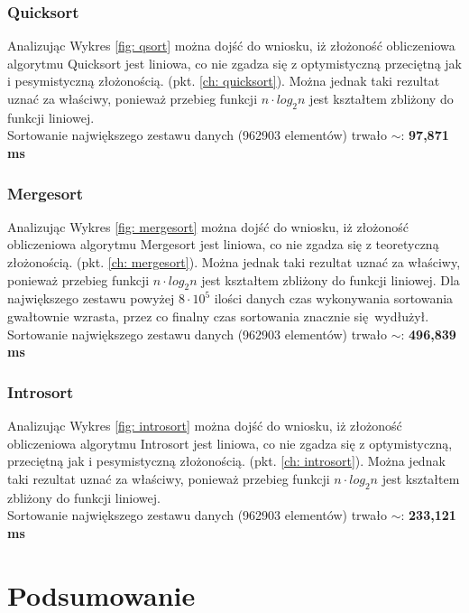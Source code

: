 \documentclass[12pt]{article}
\begin{document}
\subsubsection{Quicksort}
Analizując Wykres \ref{fig: qsort} można dojść do wniosku, iż złożoność obliczeniowa algorytmu Quicksort jest
liniowa, co nie zgadza się z optymistyczną przeciętną jak i pesymistyczną złożonością. (pkt. \ref{ch: quicksort}). Można 
jednak taki rezultat uznać za właściwy, ponieważ przebieg funkcji $n \cdot log_2 n$ jest kształtem zbliżony do funkcji 
liniowej.\\

Sortowanie największego zestawu danych (962903 elementów) trwało $\sim$: \textbf{97,871 ms}

\subsubsection{Mergesort}


Analizując Wykres \ref{fig: mergesort} można dojść do wniosku, iż złożoność obliczeniowa algorytmu Mergesort jest
liniowa, co nie zgadza się z teoretyczną złożonością. (pkt. \ref{ch: mergesort}). Można 
jednak taki rezultat uznać za właściwy, ponieważ przebieg funkcji $n \cdot log_2 n$ jest kształtem zbliżony do funkcji 
liniowej. Dla największego zestawu powyżej $8 \cdot 10^5$ ilości danych czas wykonywania sortowania gwałtownie wzrasta,
przez co finalny czas sortowania znacznie się wydłużył. \\

Sortowanie największego zestawu danych (962903 elementów) trwało $\sim$: \textbf{496,839 ms}

\subsubsection{Introsort}
Analizując Wykres \ref{fig: introsort} można dojść do wniosku, iż złożoność obliczeniowa algorytmu Introsort jest
liniowa, co nie zgadza się z optymistyczną, przeciętną jak i pesymistyczną złożonością. (pkt. \ref{ch: introsort}). Można 
jednak taki rezultat uznać za właściwy, ponieważ przebieg funkcji $n \cdot log_2 n$ jest kształtem zbliżony do funkcji 
liniowej.\\

Sortowanie największego zestawu danych (962903 elementów) trwało $\sim$: \textbf{233,121 ms}

\section{Podsumowanie}
\end{document}
